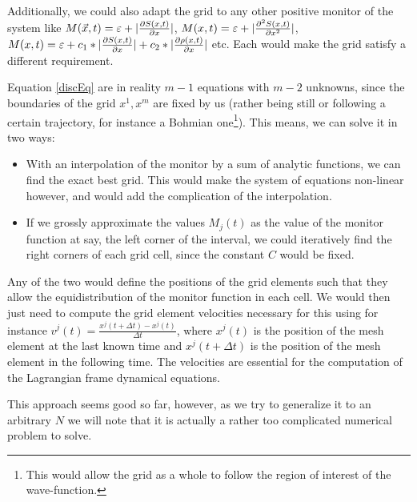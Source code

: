\documentclass[11pt, a4paper]{article} %
\begin{document}
\newpage
Additionally, we could also adapt the grid to any other positive monitor of the system like $M(\vec{x},t)=\varepsilon+|\pdv{S(x,t)}{x}|$, $M(x,t)=\varepsilon+|\pdv[2]{S(x,t)}{x}|$, $M(x,t)=\varepsilon+c_1*|\pdv{S(x,t)}{x}|+c_2*|\pdv{\rho(x,t)}{x}|$ etc. Each would make the grid satisfy a different requirement.

Equation \eqref{discEq} are in reality $m-1$ equations with $m-2$ unknowns, since the boundaries of the grid $x^1, x^m$ are fixed by us (rather being still or following a certain trajectory, for instance a Bohmian one\footnote{This would allow the grid as a whole to follow the region of interest of the wave-function.}). This means, we can solve it in two ways: \vspace{-0.2cm}
\begin{itemize}
\item With an interpolation of the monitor by a sum of analytic functions, we can find the exact best grid. This would make the system of equations non-linear however, and would add the complication of the interpolation.

\item If we grossly approximate the values $M_j(t)$ as the value of the monitor function at say, the left corner of the interval, we could iteratively find the right corners of each grid cell, since the constant $C$ would be fixed.\vspace{-0.2cm}
\end{itemize}

Any of the two would define the positions of the grid elements such that they allow the equidistribution of the monitor function in each cell. We would then just need to compute the grid element velocities necessary for this using for instance $v^j(t)=\frac{x^j(t+\Delta t)-x^j(t)}{\Delta t}$, where $x^j(t)$ is the position of the mesh element at the last known time and $x^j(t+\Delta t)$ is the position of the mesh element in the following time. The velocities are essential for the computation of the Lagrangian frame dynamical equations.

This approach seems good so far, however, as we try to generalize it to an arbitrary $N$ we will note that it is actually a rather too complicated numerical problem to solve.
\end{document}
